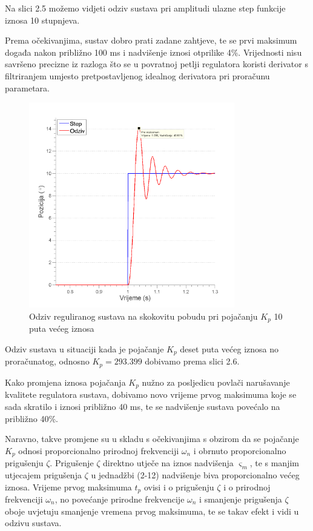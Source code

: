 \documentclass[12pt,a4paper]{article}
\begin{document}
Na slici 2.5 možemo vidjeti odziv sustava pri amplitudi ulazne step funkcije iznosa 10 stupnjeva.

Prema očekivanjima, sustav dobro prati zadane zahtjeve, te se prvi maksimum događa nakon približno 100 ms i nadvišenje iznosi otprilike 4\%. Vrijednosti nisu savršeno precizne iz razloga što se u povratnoj petlji regulatora koristi derivator s filtriranjem umjesto pretpostavljenog idealnog derivatora pri proračunu parametara.

\newpage


\begin{figure}[h]
	\begin{center}
	\includegraphics[width=0.8\textwidth] {odziv_2.png}
    \caption{Odziv reguliranog sustava na skokovitu pobudu pri pojačanju $K_p$ 10 puta većeg iznosa }
    \end{center}
\end{figure}

Odziv sustava u situaciji kada je pojačanje $K_p$ deset puta većeg iznosa no proračunatog, odnosno $K_p = 293.399$ dobivamo prema slici 2.6.

Kako promjena iznosa pojačanja $K_p$ nužno za posljedicu povlači narušavanje kvalitete regulatora sustava, dobivamo novo vrijeme prvog maksimuma koje se sada skratilo i iznosi približno 40 ms, te se nadvišenje sustava povećalo na približno 40\%. 

Naravno, takve promjene su u skladu s očekivanjima s obzirom da se pojačanje $K_p$ odnosi proporcionalno prirodnoj frekvenciji $\omega_n$ i obrnuto proporcionalno prigušenju $\zeta$. Prigušenje $\zeta$ direktno utječe na iznos nadvišenja $\varsigma_m$, te s manjim utjecajem prigušenja $\zeta$ u jednadžbi (2-12) nadvišenje biva proporcionalno većeg iznosa. Vrijeme prvog maksimuma $t_p$ ovisi i o prigušenju $\zeta$ i o prirodnoj frekvenciji $\omega_n$, no povećanje prirodne frekvencije $\omega_n$ i smanjenje prigušenja $\zeta$ oboje uvjetuju smanjenje vremena prvog maksimuma, te se takav efekt i vidi u odzivu sustava.
\end{document}
